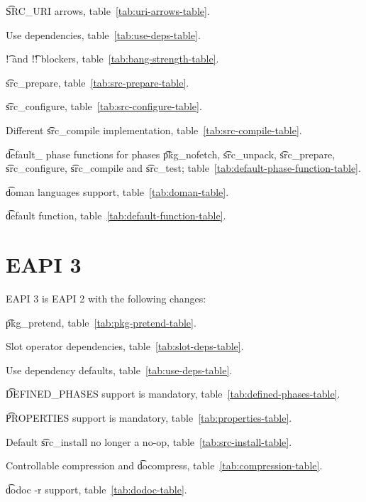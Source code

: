 \begin{compactitem}
\item \t{SRC\_URI} arrows, table~\ref{tab:uri-arrows-table}.
\item Use dependencies, table~\ref{tab:use-deps-table}.
\item \t{!} and \t{!!} blockers, table~\ref{tab:bang-strength-table}.
\item \t{src\_prepare}, table~\ref{tab:src-prepare-table}.
\item \t{src\_configure}, table~\ref{tab:src-configure-table}.
\item Different \t{src\_compile} implementation, table~\ref{tab:src-compile-table}.
\item \t{default\_} phase functions for phases \t{pkg\_nofetch}, \t{src\_unpack}, \t{src\_prepare},
    \t{src\_configure}, \t{src\_compile} and \t{src\_test}; table~\ref{tab:default-phase-function-table}.
\item \t{doman} languages support, table~\ref{tab:doman-table}.
\item \t{default} function, table~\ref{tab:default-function-table}.
\end{compactitem}

\section*{EAPI 3}

EAPI 3 is EAPI 2 with the following changes:

\begin{compactitem}
\item \t{pkg\_pretend}, table~\ref{tab:pkg-pretend-table}.
\item Slot operator dependencies, table~\ref{tab:slot-deps-table}.
\item Use dependency defaults, table~\ref{tab:use-deps-table}.
\item \t{DEFINED\_PHASES} support is mandatory, table~\ref{tab:defined-phases-table}.
\item \t{PROPERTIES} support is mandatory, table~\ref{tab:properties-table}.
\item Default \t{src\_install} no longer a no-op, table~\ref{tab:src-install-table}.
\item Controllable compression and \t{docompress}, table~\ref{tab:compression-table}.
\item \t{dodoc -r} support, table~\ref{tab:dodoc-table}.
\end{compactitem}


